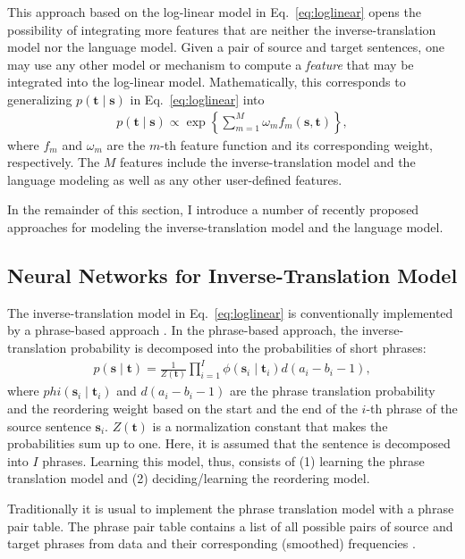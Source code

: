 \documentclass[11pt, oneside]{essay}
\newcommand{\vect}[1]{\mathbf{#1}}
\newcommand{\vs}[0]{\vect{s}}
\newcommand{\vt}[0]{\vect{t}}
\newcommand{\tred}[1]{\textcolor{red}{#1}}
\begin{document}
This approach based on the log-linear model in
Eq.~\eqref{eq:loglinear} opens the possibility of integrating
more features that are neither the inverse-translation model nor
the language model. Given a pair of source and target sentences,
one may use any other model or mechanism to compute a
\textit{feature} that may be integrated into the log-linear
model. Mathematically, this corresponds to generalizing $p(\vt
\mid \vs)$ in Eq.~\eqref{eq:loglinear} into
\begin{align}
\label{eq:loglinear_general}
    p(\vt \mid \vs) \propto \exp\left\{  
    \sum_{m=1}^M \omega_m f_m(\vs, \vt)
    \right\}, 
\end{align}
where $f_m$ and $\omega_m$ are the $m$-th feature function and
its corresponding weight, respectively. The $M$ features include
the inverse-translation model and the language modeling as well
as any other user-defined features.

In the remainder of this section, I introduce a number of
recently proposed approaches for modeling the
inverse-translation model and the language model.

\subsection{Neural Networks for Inverse-Translation Model}
\label{sec:nntm}

The inverse-translation model in Eq.~\eqref{eq:loglinear} is conventionally
implemented by a phrase-based approach \citep[see,
e.g.,][]{Koehn2003,Marcu2002}.  In the phrase-based approach, the
inverse-translation probability is decomposed into the
probabilities of short phrases:
\begin{align}
\label{eq:phrase_decomp}
    p(\vs \mid \vt) = \frac{1}{Z(\vt)} \prod_{i=1}^{I} \phi(\vs_i \mid \vt_i) d(a_i -
    b_i -1),
\end{align}
where $phi(\vs_i \mid \vt_i)$ and $d(a_i - b_i - 1)$ are the
phrase translation probability and the reordering weight based on
the start and the end of the $i$-th phrase of the source sentence
$\vs_i$. $Z(\vt)$ is a normalization constant that makes the
probabilities sum up to one. Here, it is assumed that the
sentence is decomposed into $I$ phrases. Learning this model,
thus, consists of (1) learning the phrase translation model and
(2) deciding/learning the reordering model.  

Traditionally it is usual to implement the phrase translation
model with a phrase pair table. The phrase pair table contains a
list of all possible pairs of source and target phrases from data
and their corresponding (smoothed) frequencies \citep[see,
e.g.,][]{Koehn2003,Koehn2010}. 
\end{document}

